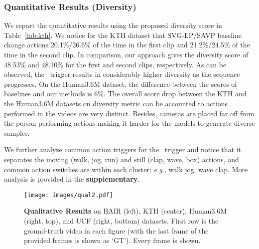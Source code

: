 \documentclass{article} \usepackage{iclr2021_conference,times}
\newcommand{\GP}{}
\def\eg{\emph{e.g.}}
\begin{document}
\subsubsection{Quantitative Results (Diversity)}
\vspace{-0.05in}
We report the quantitative results using the proposed diversity score in Table~\ref{tab:kth}. We notice for the KTH dataset that SVG-LP/SAVP baseline change actions 20.1\%/26.6\% of the time in the first clip and 21.2\%/24.5\% of the time in the second clip.  In comparison, our approach gives the diversity score of 48.53\% and 48.10\% for the first and second clips, respectively. As can be observed, the \GP\ trigger results in considerably higher diversity as the sequence progresses. On the Human3.6M dataset, the difference between the scores of baselines and our methods is 6\%. The overall score drop between the KTH and the Human3.6M datasets on diversity metric can be accounted to actions performed in the videos are very distinct. Besides, cameras are placed far off from the person performing actions making it harder for the models to generate diverse samples.

We further analyze common action triggers for the \GP\ trigger and notice that it separates the moving (walk, jog, run) and still (clap, wave, box) actions, and common action switches are within each cluster; \eg, walk  jog, wave  clap. More analysis is provided in the \textbf{supplementary}.
\begin{figure}
    \centering

    \texttt{[image: Images/qual2.pdf]}

    \caption{\textbf{Qualitative Results} on BAIR (left), KTH (center), Human3.6M (right, top), and UCF (right, bottom) datasets. First row is the ground-truth video in each figure (with the last frame of the provided  frames is shown as `GT'). Every  frame is shown.}
    \label{fig:qualitative}
\end{figure}

\vspace{-0.05in}
\end{document}
